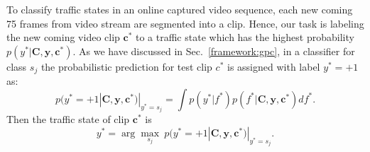 To classify traffic states in an online captured video sequence, each new coming 75 frames from video stream are segmented into a clip. Hence, our task is labeling the new coming video clip $\mathbf{c}^*$ to a traffic state which has the highest probability $p(y^*|\mathbf{C},\mathbf{y},\mathbf{c}^*)$. 
As we have discussed in Sec.~\ref{framework:gpc}, in a classifier for class $s_j$ the probabilistic prediction for test clip $c^*$ is assigned with label $y^*=+1$ as:
\begin{equation}
	p(y^*=+1|\mathbf{C},\mathbf{y},\mathbf{c}^*)|_{y^*=s_j} = \int p(y^*|f^*)p(f^*|\mathbf{C},\mathbf{y},\mathbf{c}^*) df^*. \label{GPCprob}
\end{equation}
Then the traffic state of clip $\mathbf{c}^*$ is
\begin{equation}
	y^* = \arg\max_{s_j}~p(y^*=+1|\mathbf{C},\mathbf{y},\mathbf{c}^*)|_{y^*=s_j}.
	\label{gp_label}
\end{equation}




